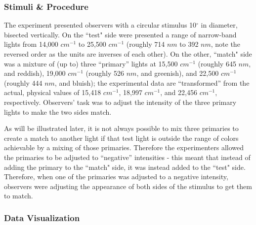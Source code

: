 \documentclass{article}
\begin{document}
\begin{multicols}{2}
\subsubsection{Stimuli \& Procedure} %

The experiment presented observers with a circular stimulus 10$^\circ$ in diameter, bisected vertically.  On the ``test" side were presented a range of narrow-band lights from 14,000 $cm^{-1}$ to 25,500 $cm^{-1}$ (roughly 714 $nm$ to 392 $nm$, note the reversed order as the units are inverses of each other).  On the other, ``match" side was a mixture of (up to) three “primary” lights at 15,500 $cm^{-1}$ (roughly 645 $nm$, and reddish), 19,000 $cm^{-1}$ (roughly 526 $nm$, and greenish), and 22,500 $cm^{-1}$ (roughly 444 $nm$, and bluish); the experimental data are “transformed” from the actual, physical values of 15,418 $cm^{-1}$, 18,997 $cm^{-1}$, and 22,456 $cm^{-1}$, respectively.  Observers’ task was to adjust the intensity of the three primary lights to make the two sides match.

As will be illustrated later, it is not always possible to mix three primaries to create a match to another light if that test light is outside the range of colors achievable by a mixing of those primaries.  Therefore the experimenters allowed the primaries to be adjusted to “negative” intensities - this meant that instead of adding the primary to the ``match" side, it was instead added to the ``test" side.  Therefore, when one of the primaries was adjusted to a negative intensity, observers were adjusting the appearance of both sides of the stimulus to get them to match.

\subsubsection{Data Visualization} %


\end{multicols}
\end{document}
